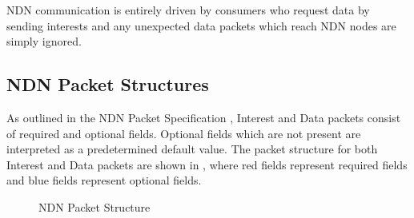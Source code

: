 NDN communication is entirely driven by consumers who request data by sending interests and any unexpected data packets which reach NDN nodes are simply ignored.

\subsection{NDN Packet Structures}\label{sec:ndn-packet-structure}
As outlined in the NDN Packet Specification \cite{ndn-packet-spec}, Interest and Data packets consist of required and optional fields. Optional fields which are not present are interpreted as a predetermined default value. The packet structure for both Interest and Data packets are shown in , where red fields represent required fields and blue fields represent optional fields.

\begin{figure}[H]
    \centering
    \caption{NDN Packet Structure \cite{ndn}}
    \label{fig:ndn-packet-structure}
\end{figure}

